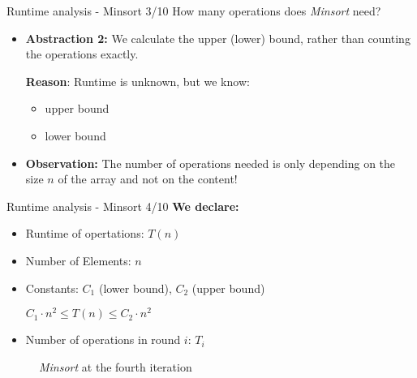 \begin{frame}{Runtime analysis - Minsort 3/10}
  How many operations does \textit{Minsort} need?
  \begin{itemize}
    \item
      \textbf{Abstraction 2:} We calculate the upper (lower) bound,
      rather than counting the operations exactly.

      \textbf{Reason}: Runtime is unknown, but we know:
      \begin{itemize}
        \item {\color{Hell-Gruen}upper bound}
        \item {\color{Hell-Gruen}lower bound}
      \end{itemize}
    \item
      \textbf{Observation:} The number of operations needed is only
      depending on the size {\color{Mittel-Blau}$n$} of the array and not on the content!
  \end{itemize}
\end{frame}


\begin{frame}{Runtime analysis - Minsort 4/10}
  \textbf{We declare:}
  \begin{itemize}
    \item Runtime of opertations: $T(n)$
    \item Number of Elements: $n$
    \item Constants: $C_1$ ({\color{Hell-Gruen}lower bound}),
      $C_2$ ({\color{Hell-Gruen}upper bound})
    \begin{center}
      $C_{1} \cdot n^2
      \leq T(n)
      \leq C_{2} \cdot n^2$
    \end{center}
    \item Number of operations in round $i$: $T_i$
  \end{itemize}
  \begin{figure}[!h]
    \begin{minipage}[!h]{0.5\linewidth}%
    \end{minipage}%
    \caption{\textit{Minsort} at the fourth iteration}%
    \label{fig:minsort_def}%
  \end{figure}
\end{frame}

